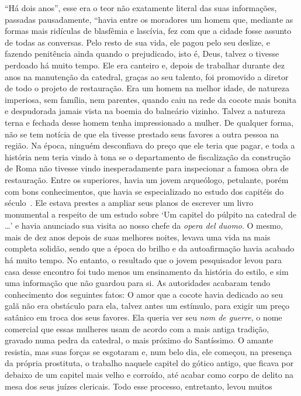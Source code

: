 ``Há dois anos'', esse era o teor não exatamente literal das suas
informações, passadas pausadamente, ``havia entre os moradores um homem
que, mediante as formas mais ridículas de blasfêmia e lascívia, fez com
que a cidade fosse assunto de todas as conversas. Pelo resto de sua
vida, ele pagou pelo seu deslize, e fazendo penitência ainda quando o
prejudicado, isto é, Deus, talvez o tivesse perdoado há muito tempo. Ele
era canteiro e, depois de trabalhar durante dez anos na manutenção da
catedral, graças ao seu talento, foi promovido a diretor de todo o
projeto de restauração. Era um homem na melhor idade, de natureza
imperiosa, sem família, nem parentes, quando caiu na rede da cocote mais
bonita e despudorada jamais vista na boemia do balneário vizinho. Talvez
a natureza terna e fechada desse homem tenha impressionado a mulher. De
qualquer forma, não se tem notícia de que ela tivesse prestado seus
favores a outra pessoa na região. Na época, ninguém desconfiava do preço
que ele teria que pagar, e toda a história nem teria vindo à tona se o
departamento de fiscalização da construção de Roma não tivesse vindo
inesperadamente para inspecionar a famosa obra de restauração. Entre os
superiores, havia um jovem arqueólogo, petulante, porém com bons
conhecimentos, que havia se especializado no estudo dos capitéis do
século~. Ele estava prestes a ampliar seus planos de escrever um
livro monumental a respeito de um estudo sobre `Um capitel do púlpito na
catedral de \ldots{}' e havia anunciado sua visita ao nosso chefe da
\emph{opera del duomo}. O mesmo, mais de dez anos depois de suas
melhores noites, levava uma vida na mais completa solidão, sendo que a
época do brilho e da autoafirmação havia acabado há muito tempo. No
entanto, o resultado que o jovem pesquisador levou para casa desse
encontro foi tudo menos um ensinamento da história do estilo, e sim uma
informação que não guardou para si. As autoridades acabaram tendo
conhecimento dos seguintes fatos: O amor que a cocote havia dedicado ao
seu galã não era obstáculo para ela, talvez antes um estímulo, para
exigir um preço satânico em troca dos seus favores. Ela queria ver seu
\emph{nom de guerre}, o nome comercial que essas mulheres usam de acordo
com a mais antiga tradição, gravado numa pedra da catedral, o mais
próximo do Santíssimo. O amante resistia, mas suas forças se esgotaram
e, num belo dia, ele começou, na presença da própria prostituta, o
trabalho naquele capitel do gótico antigo, que ficava por debaixo de um
capitel mais velho e corroído, até acabar como corpo de delito na mesa
dos seus juízes clericais. Todo esse processo, entretanto, levou muitos
